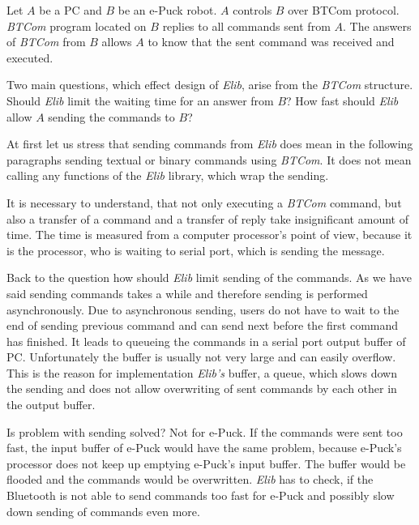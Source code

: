 \documentclass[12pt,notitlepage]{report}
\begin{document}
	  
	Let $A$ be a PC and $B$ be an e-Puck robot. $A$ controls $B$ over BTCom protocol. {\it BTCom} program located on $B$ 
	replies to all commands sent from $A$.
	The answers of {\it BTCom} from $B$ allows $A$ to know that the sent command was received and
	executed. 
	 
	Two main questions, which effect design of {\it Elib}, arise from the {\it BTCom} structure.
	Should {\it Elib} limit the waiting time for an answer from $B$?
	How fast should {\it Elib} allow $A$ sending the commands to $B$?
	 
	At first let us stress that sending commands from {\it Elib} does mean in the following paragraphs
	sending textual or binary commands
	using {\it BTCom}. It does not mean calling any functions of the {\it Elib} library, which wrap the sending. 
	 
	It is necessary to understand, that not only executing a {\it BTCom} command, 
	but also a transfer of a command and a transfer of reply take insignificant amount of time. 
	The time is measured from a computer processor's point of view, because
	it is the processor, who is waiting to serial port, which is sending the message.
	 
	Back to the question how should {\it Elib} limit sending of the commands.
	As we have said sending commands takes a while and therefore sending is performed asynchronously. 
	Due to asynchronous sending, users do not have to wait to the end of sending previous command and
	can send next before the first command has finished.
	It leads to queueing the commands in a serial port output buffer of PC. Unfortunately the buffer is usually not 
	very large and can easily overflow. 
	This is the reason for implementation {\it Elib's} buffer, a queue, which slows down the sending and does not allow
	overwriting of sent commands by each other in the output buffer. 
	 
	Is problem with sending solved? Not for e-Puck. If the commands were sent too fast,
	the input buffer of e-Puck would have the same problem, because e-Puck's processor does not keep up emptying e-Puck's
	input buffer. The buffer would be flooded and the commands would be overwritten. 
	{\it Elib} has to check, if the Bluetooth is not able to send commands too fast for e-Puck
	and possibly slow down sending of commands even more.

	 
\end{document}
